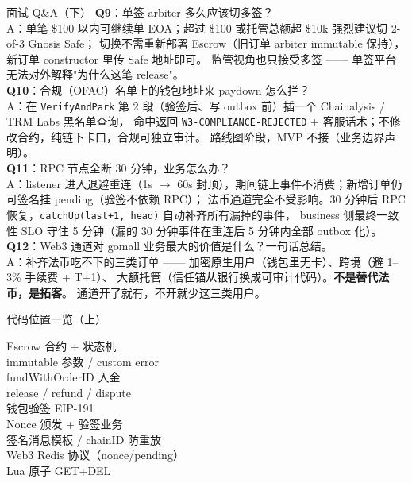 \documentclass[aspectratio=169,11pt]{beamer}
\begin{document}
\begin{frame}[shrink]{面试 Q\&A（下）}
\textbf{Q9}：单签 arbiter 多久应该切多签？\\
\hspace{4mm}\small A：单笔 \$100 以内可继续单 EOA；超过 \$100 或托管总额超 \$10k 强烈建议切 2-of-3 Gnosis Safe；
切换不需重新部署 Escrow（旧订单 arbiter immutable 保持），新订单 constructor 里传 Safe 地址即可。
监管视角也只接受多签 —— 单签平台无法对外解释"为什么这笔 release"。\\

\vspace{1.5mm}
\textbf{Q10}：合规（OFAC）名单上的钱包地址来 paydown 怎么拦？\\
\hspace{4mm}\small A：在 \texttt{VerifyAndPark} 第 2 段（验签后、写 outbox 前）插一个 Chainalysis / TRM Labs 黑名单查询，
命中返回 \texttt{W3-COMPLIANCE-REJECTED} + 客服话术；不修改合约，纯链下卡口，合规可独立审计。
路线图阶段，MVP 不接（业务边界声明）。\\

\vspace{1.5mm}
\textbf{Q11}：RPC 节点全断 30 分钟，业务怎么办？\\
\hspace{4mm}\small A：listener 进入退避重连（1s $\to$ 60s 封顶），期间链上事件不消费；新增订单仍可签名挂 pending（验签不依赖 RPC）；
法币通道完全不受影响。30 分钟后 RPC 恢复，\texttt{catchUp(last+1, head)} 自动补齐所有漏掉的事件，
business 侧最终一致性 SLO 守住 5 分钟（漏的 30 分钟事件在重连后 5 分钟内全部 outbox 化）。\\

\vspace{1.5mm}
\textbf{Q12}：Web3 通道对 gomall 业务最大的价值是什么？一句话总结。\\
\hspace{4mm}\small A：补齐法币吃不下的三类订单 —— 加密原生用户（钱包里无卡）、跨境（避 1--3\% 手续费 + T+1）、
大额托管（信任锚从银行换成可审计代码）。\textbf{不是替代法币，是拓客}。
通道开了就有，不开就少这三类用户。\\
\end{frame}

\begin{frame}[shrink]{代码位置一览（上）}
\small
\begin{description}
  \item[Escrow 合约 + 状态机]
  \item[immutable 参数 / custom error]
  \item[fundWithOrderID 入金]
  \item[release / refund / dispute]
  \item[钱包验签 EIP-191]
  \item[Nonce 颁发 + 验签业务]
  \item[签名消息模板 / chainID 防重放]
  \item[Web3 Redis 协议（nonce/pending）]
  \item[Lua 原子 GET+DEL]
\end{description}
\end{frame}
\end{document}
